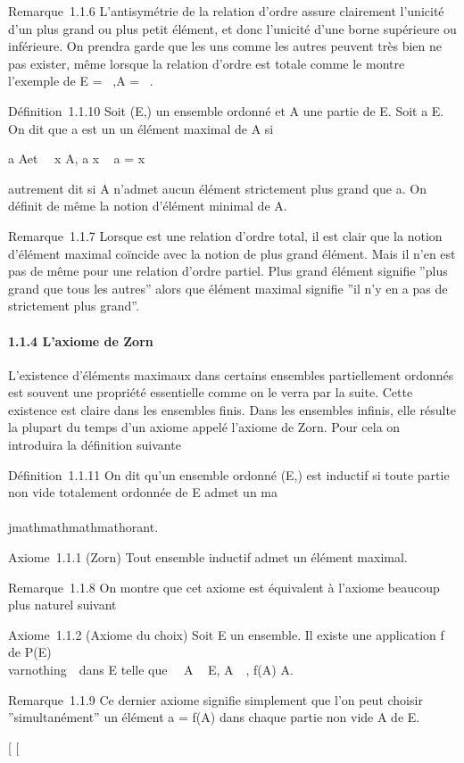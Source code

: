Remarque~1.1.6 L'antisymétrie de la relation d'ordre assure clairement
l'unicité d'un plus grand ou plus petit élément, et donc l'unicité d'une
borne supérieure ou inférieure. On prendra garde que les uns comme les
autres peuvent très bien ne pas exister, même lorsque la relation
d'ordre est totale comme le montre l'exemple de E = ~,A = ~.

Définition~1.1.10 Soit (E,\leqslant) un ensemble ordonné et A une partie de E.
Soit a \in E. On dit que a est un un élément maximal de A si

a \in A\text et \quad
\forall~~x \in A, a \leqslant x \rigtharrow~ a = x

autrement dit si A n'admet aucun élément strictement plus grand que a.
On définit de même la notion d'élément minimal de A.

Remarque~1.1.7 Lorsque \leqslant est une relation d'ordre total, il est clair
que la notion d'élément maximal coïncide avec la notion de plus grand
élément. Mais il n'en est pas de même pour une relation d'ordre partiel.
Plus grand élément signifie ''plus grand que tous les autres'' alors que
élément maximal signifie ''il n'y en a pas de strictement plus grand''.

\paragraph{1.1.4 L'axiome de Zorn}

L'existence d'éléments maximaux dans certains ensembles partiellement
ordonnés est souvent une propriété essentielle comme on le verra par la
suite. Cette existence est claire dans les ensembles finis. Dans les
ensembles infinis, elle résulte la plupart du temps d'un axiome appelé
l'axiome de Zorn. Pour cela on introduira la définition suivante

Définition~1.1.11 On dit qu'un ensemble ordonné (E,\leqslant) est inductif si
toute partie non vide totalement ordonnée de E admet un ma\\\\jmathmathmathmathorant.

Axiome~1.1.1 (Zorn) Tout ensemble inductif admet un élément maximal.

Remarque~1.1.8 On montre que cet axiome est équivalent à l'axiome
beaucoup plus naturel suivant

Axiome~1.1.2 (Axiome du choix) Soit E un ensemble. Il existe une
application f de P(E) \diagdown\\varnothing~\ dans E
telle que \forall~~A \subset~ E,
A\neq~\varnothing~, f(A) \in A.

Remarque~1.1.9 Ce dernier axiome signifie simplement que l'on peut
choisir ''simultanément'' un élément a = f(A) dans chaque partie non
vide A de E.

{[}
{[}
